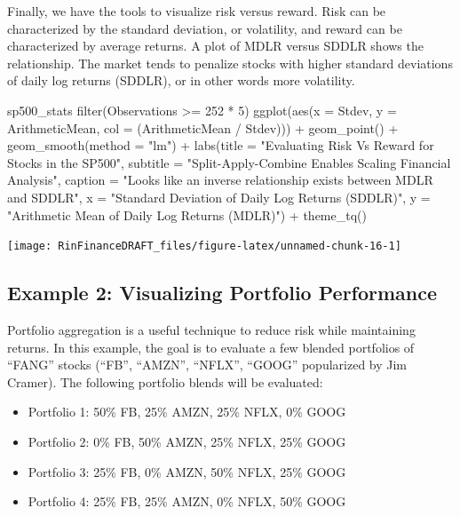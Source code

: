 Finally, we have the tools to visualize risk versus reward. Risk can be
characterized by the standard deviation, or volatility, and reward can
be characterized by average returns. A plot of MDLR versus SDDLR shows
the relationship. The market tends to penalize stocks with higher
standard deviations of daily log returns (SDDLR), or in other words more
volatility.

\begin{Schunk}
\begin{Sinput}
sp500_stats %
    filter(Observations >= 252 * 5) %
    ggplot(aes(x = Stdev, y = ArithmeticMean, col = (ArithmeticMean / Stdev))) +
    geom_point() +
    geom_smooth(method = "lm") +
    labs(title = "Evaluating Risk Vs Reward for Stocks in the SP500",
         subtitle = "Split-Apply-Combine Enables Scaling Financial Analysis",
         caption = "Looks like an inverse relationship exists between MDLR and SDDLR",
         x = "Standard Deviation of Daily Log Returns (SDDLR)",
         y = "Arithmetic Mean of Daily Log Returns (MDLR)") +
    theme_tq()
\end{Sinput}


\begin{center}\texttt{[image: RinFinanceDRAFT\_files/figure-latex/unnamed-chunk-16-1]} \end{center}

\end{Schunk}

\subsection{Example 2: Visualizing Portfolio
Performance}\label{example-2-visualizing-portfolio-performance}

Portfolio aggregation is a useful technique to reduce risk while
maintaining returns. In this example, the goal is to evaluate a few
blended portfolios of ``FANG'' stocks (``FB'', ``AMZN'', ``NFLX'',
``GOOG'' popularized by Jim Cramer). The following portfolio blends will
be evaluated:

\begin{itemize}
\tightlist
\item
  Portfolio 1: 50\% FB, 25\% AMZN, 25\% NFLX, 0\% GOOG
\item
  Portfolio 2: 0\% FB, 50\% AMZN, 25\% NFLX, 25\% GOOG
\item
  Portfolio 3: 25\% FB, 0\% AMZN, 50\% NFLX, 25\% GOOG
\item
  Portfolio 4: 25\% FB, 25\% AMZN, 0\% NFLX, 50\% GOOG
\end{itemize}

